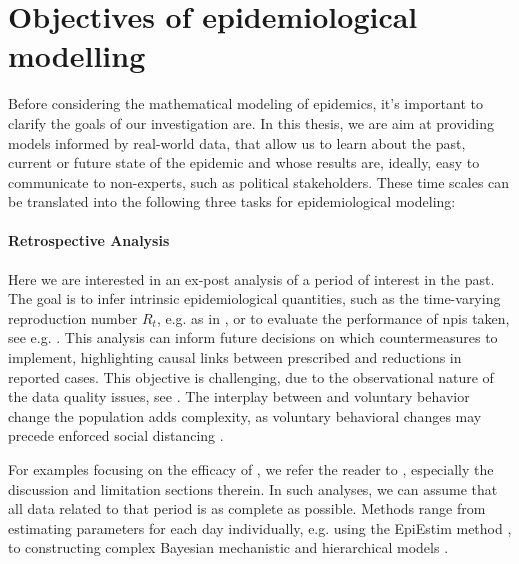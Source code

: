 \section{Objectives of epidemiological modelling}
\label{sec:objectives}

Before considering the mathematical modeling of epidemics, it's important to clarify the goals of our investigation are. In this thesis, we are aim at providing models informed by real-world data, that allow us to learn about the past, current or future state of the epidemic and whose results are, ideally, easy to communicate to non-experts, such as political stakeholders.
These time scales can be translated into the following three tasks for epidemiological modeling:

\paragraph{Retrospective Analysis}
Here we are interested in an ex-post analysis of a period of interest in the past. The goal is to infer intrinsic epidemiological quantities, such as the time-varying reproduction number $R_{t}$, e.g. as in  \citep{Abbott2020Estimating}, or to evaluate the performance of \glspl{npi} taken, see e.g. \citep{Flaxman2020Estimating,Brauner2021Inferring,Khazaei2023Using}. This analysis can inform future decisions on which countermeasures to implement, highlighting causal links between  prescribed and reductions in reported cases. This objective is challenging, due to the observational nature of the data quality issues, see . The interplay between  and voluntary behavior change the population adds complexity, as voluntary behavioral changes may precede enforced social distancing \citep{Gupta2020Mandated}. 

For examples focusing on the efficacy of , we refer the reader to \citep{Flaxman2020Estimating,Brauner2021Inferring,Khazaei2023Using}, especially the discussion and limitation sections therein. 
In such analyses, we can assume that all data related to that period is as complete as possible.
Methods range from estimating parameters for each day individually, e.g. using the EpiEstim \citep{Cori2021EpiEstim} method \citep{Abbott2020Estimating}, to constructing complex Bayesian mechanistic \citep{Flaxman2020Estimating} and hierarchical models \citep{Brauner2021Inferring,Khazaei2023Using}. 

